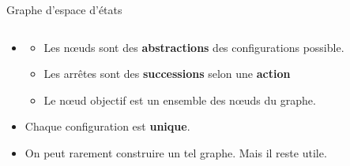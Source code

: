 \documentclass{beamer}
\begin{document}
\begin{frame}[t]{Graphe d'espace d'états}
  
  \begin{columns}
    \begin{column}{0.4\textwidth}
      \begin{itemize}
        \small
      \item<2->  
        \begin{itemize}
          \scriptsize
        \item<3-> Les \alert{nœuds} sont des \textbf{abstractions} des
          configurations possible.
        \item<4-> Les \alert{arrêtes} sont des \textbf{successions}
          selon une \textbf{action} 
        \item<5-> Le nœud \alert{objectif} est un ensemble des nœuds
          du graphe.
        \end{itemize}
      \item<6-> Chaque configuration est \textbf{\alert{unique}}. 
      \item<7-> On peut \alert{rarement} construire un tel graphe. Mais il
        reste utile.
      \end{itemize}
    \end{column}
    \begin{column}{0.6\textwidth}
    \end{column}
  \end{columns}
\end{frame}
\end{document}
